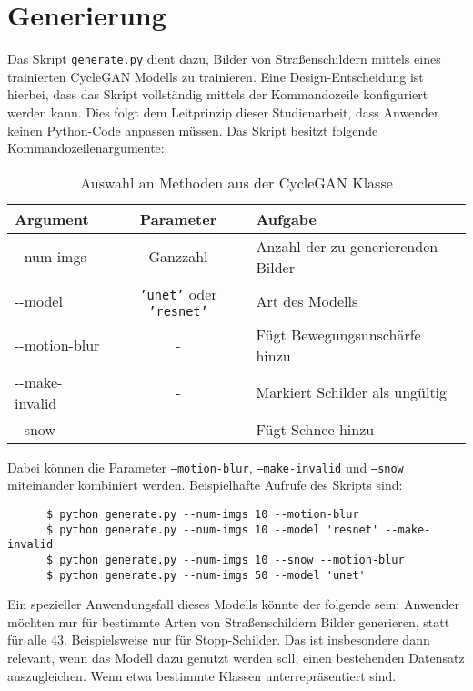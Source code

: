 \section{Generierung}
Das Skript \texttt{generate.py} dient dazu, Bilder von Straßenschildern mittels eines trainierten \ac{CycleGAN} Modells zu trainieren. Eine Design-Entscheidung ist hierbei, dass das Skript vollständig mittels der Kommandozeile konfiguriert werden kann. Dies folgt dem Leitprinzip dieser Studienarbeit, dass Anwender keinen Python-Code anpassen müssen. Das Skript besitzt folgende Kommandozeilenargumente:

\begin{table}[H]
   \centering
   \begin{tabular}{|l|c|l|}
   \hline
   \textbf{Argument} & \textbf{Parameter} & \textbf{Aufgabe} \\ \hline \hline
   -{}-num-imgs & Ganzzahl & Anzahl der zu generierenden Bilder \\ \hline
   -{}-model & \texttt{'unet'} oder \texttt{'resnet'} & Art des Modells \\ \hline
   -{}-motion-blur & - & Fügt Bewegungsunschärfe hinzu \\ \hline
   -{}-make-invalid & - & Markiert Schilder als ungültig \\ \hline
   -{}-snow & - & Fügt Schnee hinzu \\
   \hline
   \end{tabular}
   \caption{Auswahl an Methoden aus der CycleGAN Klasse}
\end{table}

Dabei können die Parameter \texttt{--motion-blur}, \texttt{--make-invalid} und \texttt{--snow} miteinander kombiniert werden. Beispielhafte Aufrufe des Skripts sind:

\begin{code}
   \begin{verbatim}
      $ python generate.py --num-imgs 10 --motion-blur
      $ python generate.py --num-imgs 10 --model 'resnet' --make-invalid
      $ python generate.py --num-imgs 10 --snow --motion-blur
      $ python generate.py --num-imgs 50 --model 'unet'
   \end{verbatim}
\end{code}

Ein spezieller Anwendungsfall dieses Modells könnte der folgende sein: Anwender möchten nur für bestimmte Arten von Straßenschildern Bilder generieren, statt für alle 43. Beispielsweise nur für Stopp-Schilder. Das ist insbesondere dann relevant, wenn das Modell dazu genutzt werden soll, einen bestehenden Datensatz auszugleichen. Wenn etwa bestimmte Klassen unterrepräsentiert sind.

